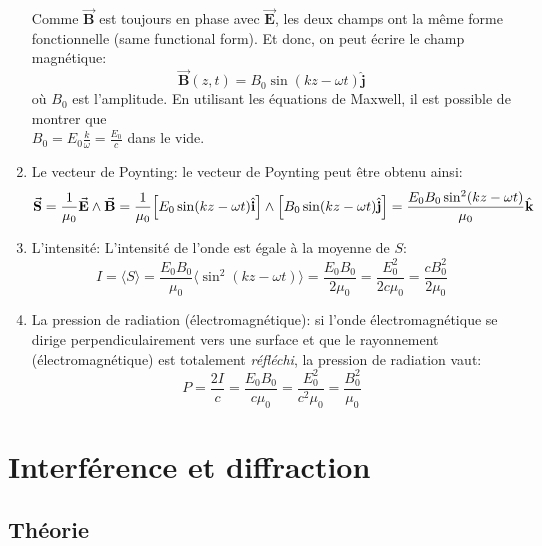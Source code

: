 \documentclass[a4paper]{article}
\begin{document}
\begin{enumerate}
Comme $ \vec{\textbf{B}} $ est toujours en phase avec $ \vec{\textbf{E}} $, les deux champs ont la même forme fonctionnelle (same functional form). Et donc, on peut écrire le champ magnétique: 
\[ \vec{\textbf{B}} (z, t) = B_0 \sin (k z - \omega t) \hat{\textbf{j}} \]
où $ B_0 $ est l'amplitude. En utilisant les équations de Maxwell, il est possible de montrer que \\
$\displaystyle B_0 = E_0 \frac{k}{\omega} = \frac{E_0}{c} $ dans le vide.
    \item Le vecteur de Poynting: le vecteur de Poynting peut être obtenu ainsi: 
\[ \vec{\textbf{S}} = \frac{1}{\mu_0} \vec{\textbf{E}} \wedge \vec{\textbf{B}} = \frac{1}{\mu_0} \Big[ E_0 \sin (k z - \omega t) \hat{\textbf{i}} \Big] \wedge \Big[ B_0 \sin (k z - \omega t) \hat{\textbf{j}} \Big] = \frac{E_0 B_0 \sin^2 (k z - \omega t)}{\mu_0} \hat{\textbf{\textbf{k}}} \]
    \item L'intensité: L'intensité de l'onde est égale à la moyenne de $ S $: 
\[ I = \langle S \rangle = \frac{E_0 B_0}{\mu_0} \langle \sin^2 (k z - \omega t) \rangle = \frac{E_0 B_0}{2 \mu_0} = 
\frac{E_0^2}{2 c \mu_0} = \frac{c B_0^2}{2 \mu_0} \]
    \item La pression de radiation (électromagnétique): si l'onde électromagnétique se dirige perpendiculairement vers une surface et 
que le rayonnement (électromagnétique) est totalement \emph{réfléchi}, la pression de radiation vaut: 
\[ P = \frac{2 I}{c} = \frac{E_0 B_0}{c \mu_0} = \frac{E_0^2}{c^2 \mu_0} = \frac{B_0^2}{\mu_0} \]

\end{enumerate}






















\section{Interférence et diffraction}









\subsection{Théorie}
\end{document}
